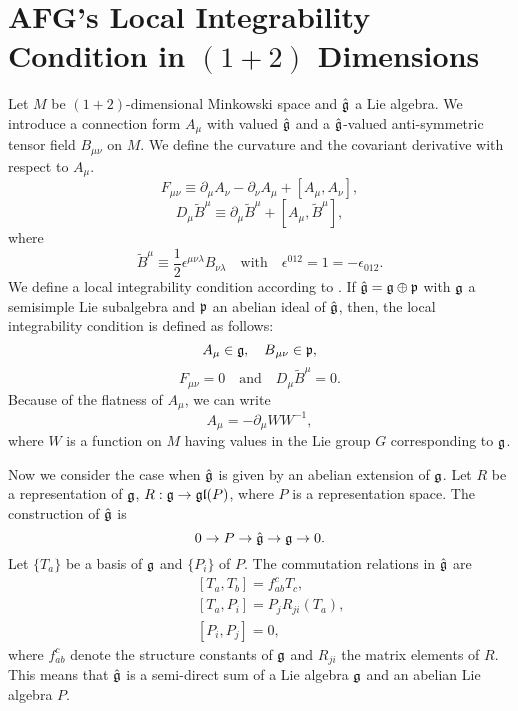 \documentclass[makeidx,12pt,openany]{report}
\begin{document}
 \section{AFG's Local Integrability Condition in $(1+2)$ Dimensions}
Let $M$ be $(1+2)$-dimensional Minkowski space and $\hat{\frak g}$ a 
Lie algebra. We introduce a connection form $A_{\mu}$ with valued 
$\hat{\frak g}$ and a $\hat{\frak g}$-valued anti-symmetric tensor field 
$B_{\mu \nu}$ on $M$. We define the curvature and the covariant derivative 
with respect to $A_{\mu}$.
\begin{equation}
 F_{\mu \nu} \equiv \partial_{\mu} A_{\nu}-\partial_{\nu} A_{\mu}
                       +[A_{\mu},A_{\nu}], 
\end{equation}
\begin{equation}
  D_{\mu}\tilde{B}^{\mu} \equiv
  \partial_{\mu}\tilde{B}^{\mu}+[A_{\mu}, \tilde{B}^{\mu}], 
\end{equation}
where
\begin{equation}
 \tilde{B}^{\mu} \equiv \frac12 \epsilon^{\mu \nu \lambda}B_{\nu \lambda}
  \quad \mbox{with} \quad
 \epsilon^{012}=1=-\epsilon_{012}.
\end{equation}
We define a local integrability condition 
according to \cite{AFG1}. If 
$\hat{\frak g}=\frak g \oplus \frak p$ with $\frak g$ a 
semisimple Lie subalgebra and $\frak p$ an abelian ideal of $\hat{\frak g}$, 
then, the local integrability condition is defined as follows:
\begin{equation}
 A_{\mu} \in \frak g , \quad \mbox{$B$}_{\mu \nu} \in \frak p,
\end{equation}
\begin{equation}
 F_{\mu \nu}=0 \quad \mbox{and} \quad D_{\mu}\tilde{B}^{\mu}=0.
 \label{eqn:16}
\end{equation}
Because of the flatness of $A_{\mu}$, we can write 
\begin{equation}
 A_{\mu}=-\partial_{\mu}W W^{-1}, 
\end{equation}
where $W$ is a function on $M$ having values in the Lie group $G$ 
corresponding to $\frak g$. 

Now we consider the case when $\hat{\frak g}$ is given by an abelian 
extension of $\frak g$. Let $R$ be a representation of $\frak g$, 
$R:\frak g \rightarrow \frak g\frak l(\mbox{$P$})$, where $P$ is a 
representation space. The construction of $\hat{\frak g}$ is 
\begin{equation}
 0 \rightarrow P \rightarrow \hat{\frak g} \rightarrow \frak g \rightarrow 
 \mbox{0}.
 \label{eqn:17}
\end{equation}
Let $\{ T_a \}$ be a basis of $\frak g$ and $\{ P_i \}$ of $P$. 
The commutation relations in $\hat{\frak g}$ are
\begin{eqnarray}
 &&[T_a, T_b]=f_{ab}^c T_c, \nonumber\\
 &&[T_a, P_i]=P_j R_{ji}(T_a), \label{eqn:18}\\
 &&[ P_i, P_j ]=0, \nonumber
\end{eqnarray}
where $f_{ab}^c$ denote the structure constants of $\frak g$ and 
$R_{ji}$ the matrix elements of $R$. This means that $\hat{\frak g}$ is 
a semi-direct sum of a Lie algebra $\frak g$ and an abelian Lie algebra $P$. 
\end{document}
